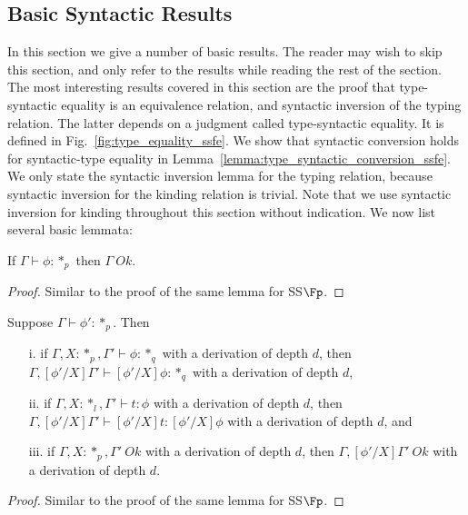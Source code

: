 \subsection{Basic Syntactic Results}
\label{subsec:basic_syntactic_lemmas_ssfe}
In this section we give a number of basic results.  The reader may
wish to skip this section, and only refer to the results while reading
the rest of the section.  The most interesting results covered in this
section are the proof that type-syntactic equality is an equivalence
relation, and syntactic inversion of the typing relation.  The latter
depends on a judgment called type-syntactic equality.  It is defined
in Fig.~\ref{fig:type_equality_ssfe}.  We show that syntactic
conversion holds for syntactic-type equality in
Lemma~\ref{lemma:type_syntactic_conversion_ssfe}.  We only state the
syntactic inversion lemma for the typing relation, because syntactic
inversion for the kinding relation is trivial.  Note that we use
syntactic inversion for kinding throughout this section without
indication.  We now list several basic lemmata:
\begin{lemma}
  If $\Gamma \vdash \phi:*_p$ then $\Gamma\ Ok$.
  \label{lemma:kinding_ok_ssfe}
\end{lemma}
\begin{proof}
  Similar to the proof of the same lemma for SS$\Fp$.
\end{proof}
\begin{lemma}
  Suppose $\Gamma \vdash \phi':*_p$.  Then
  \begin{itemize}
  \item[i.] if $\Gamma,X:*_p,\Gamma' \vdash \phi:*_q$ with a
    derivation of depth $d$, then $\Gamma,[\phi'/X]\Gamma' \vdash
    [\phi'/X]\phi:*_q$ with a derivation of depth $d$,
    
  \item[ii.] if $\Gamma, X:*_l,\Gamma' \vdash t:\phi$ with a
    derivation of depth $d$, then $\Gamma,[\phi'/X]\Gamma' \vdash
    [\phi'/X]t:[\phi'/X]\phi$ with a derivation of depth $d$, and
    
  \item[iii.] if $\Gamma,X:*_p,\Gamma'\ Ok$ with a derivation of depth $d$, then 
    $\Gamma,[\phi'/X]\Gamma'\ Ok$ with a derivation of depth $d$.
  \end{itemize}
  \label{lemma:substitution_for_kinding_ssfe}
\end{lemma}
\begin{proof}
  Similar to the proof of the same lemma for SS$\Fp$.
\end{proof}

